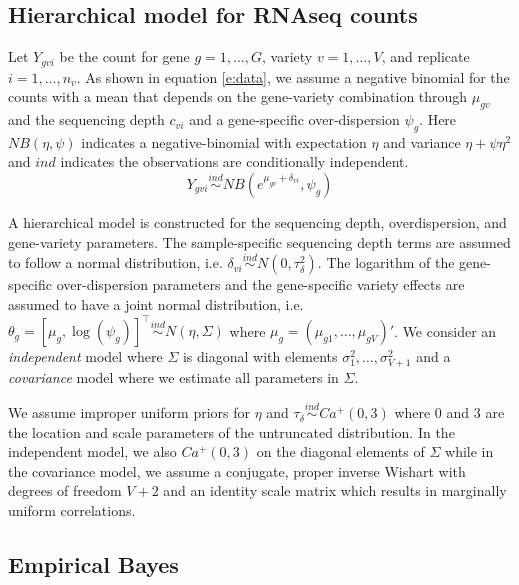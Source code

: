 \documentclass[useAMS,usenatbib,referee]{biom}
\begin{document}
\subsection{Hierarchical model for RNAseq counts}
\label{s:model}

Let $Y_{gvi}$ be the count for gene $g=1,\ldots,G$, variety $v=1,\ldots,V$, and replicate $i=1,\ldots,n_v$. As shown in equation \eqref{e:data}, we assume a negative binomial for the counts with a mean that depends on the gene-variety combination through $\mu_{gv}$ and the sequencing depth $c_{vi}$ and a gene-specific over-dispersion $\psi_g$. Here $NB(\eta,\psi)$ indicates a negative-binomial with expectation $\eta$ and variance $\eta+\psi\eta^2$ and $ind$ indicates the observations are conditionally independent.
\begin{equation} 
Y_{gvi} \stackrel{ind}{\sim} NB(e^{\mu_{gv}+\delta_{vi}},\psi_g) 
\label{e:data}
\end{equation}

A hierarchical model is constructed for the sequencing depth, overdispersion, and gene-variety parameters. The sample-specific sequencing depth terms are assumed to follow a normal distribution, i.e. $\delta_{vi} \stackrel{ind}{\sim} N(0,\tau_\delta^2)$. The logarithm of the gene-specific over-dispersion parameters and the gene-specific variety effects are assumed to have a joint normal distribution, i.e. 
$\theta_g = [\mu_g, \log(\psi_g)]^\top \stackrel{ind}{\sim} N\left(\eta, \Sigma\right)$
where $\mu_g = (\mu_{g1},\ldots,\mu_{gV})'$. We consider an \emph{independent} model where $\Sigma$ is diagonal with elements $\sigma_1^2,\ldots,\sigma_{V+1}^2$ and a \emph{covariance} model where we estimate all parameters in $\Sigma$. 

We assume improper uniform priors for $\eta$ and $\tau_\delta\stackrel{ind}{\sim} Ca^+(0,3)$ where 0 and 3 are the location and scale parameters of the untruncated distribution. In the independent model, we also $Ca^+(0,3)$ on the diagonal elements of $\Sigma$ while in the covariance model, we assume a conjugate, proper inverse Wishart with degrees of freedom $V+2$ and an identity scale matrix which results in marginally uniform correlations. 

\subsection{Empirical Bayes}
\label{s:ebayes}
\end{document}
